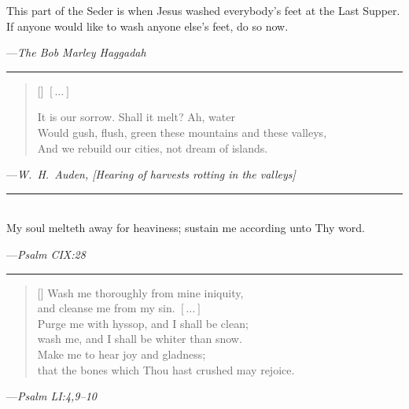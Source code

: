 \documentclass[a4paper,10pt,openany]{memoir}
\newcommand{\HgEllipsis}{\ensuremath{\left[\ldots\right]}}
\newcommand{\HgSource}[1]{\hfill{\small---\itshape{#1}}}
\newcommand{\HgFill}{\vfill \hrule \vfill}
\newenvironment{HgEnglish}{\strut\\\noindent}{\vspace{1em}}
\newcommand{\SSrc}{\textsuperscript{\upshape{[S]}}}
\begin{document}
\noindent This part of the Seder is when Jesus washed everybody’s feet at the
Last Supper. If anyone would like to wash anyone else’s feet, do so now.

\HgSource{The Bob Marley Haggadah}

\HgFill

\settowidth{\versewidth}{Would gush, flush, green these mountains and these
valleys}
\begin{verse}[\versewidth]
  \HgEllipsis

  It is our sorrow. Shall it melt? Ah, water \\
  Would gush, flush, green these mountains and these valleys, \\
  And we rebuild our cities, not dream of islands.
\end{verse}

\HgSource{W.~H.~Auden, [Hearing of harvests rotting in the valleys]}

\HgFill

\begin{HgEnglish}
  My soul melteth away for heaviness; sustain me according unto Thy word.
\end{HgEnglish}

  \HgSource{Psalm CIX:28 \SSrc}

\HgFill

\settowidth{\versewidth}{\vin that the bones which Thou hast crushed may
rejoice}
\begin{verse}[\versewidth]
  Wash me thoroughly from mine iniquity, \\
  \vin and cleanse me from my sin. \HgEllipsis \\
  Purge me with hyssop, and I shall be clean; \\
  \vin wash me, and I shall be whiter than snow. \\
  Make me to hear joy and gladness; \\
  \vin that the bones which Thou hast crushed may rejoice.
\end{verse}
\HgSource{Psalm LI:4,9--10 \SSrc}
\end{document}
